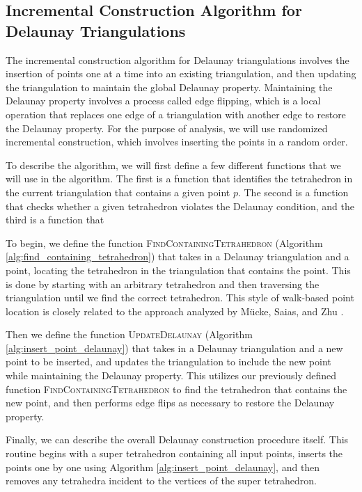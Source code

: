 \documentclass{article}
\begin{document}
\subsection{Incremental Construction Algorithm for Delaunay Triangulations}
The incremental construction algorithm for Delaunay triangulations involves the insertion of points one at a time into an existing triangulation, and then updating the triangulation to maintain the global Delaunay property. Maintaining the Delaunay property involves a process called edge flipping, which is a local operation that replaces one edge of a triangulation with another edge to restore the Delaunay property. For the purpose of analysis, we will use randomized incremental construction, which involves inserting the points in a random order. 

To describe the algorithm, we will first define a few different functions that we will use in the algorithm. The first is a function that identifies the tetrahedron in the current triangulation that contains a given point $p$. The second is a function that checks whether a given tetrahedron violates the Delaunay condition, and the third is a function that 

To begin, we define the function \textsc{FindContainingTetrahedron} (Algorithm \ref{alg:find_containing_tetrahedron}) that takes in a Delaunay triangulation and a point, locating the tetrahedron in the triangulation that contains the point. This is done by starting with an arbitrary tetrahedron and then traversing the triangulation until we find the correct tetrahedron. This style of walk-based point location is closely related to the approach analyzed by M\"ucke, Saias, and Zhu \cite{muckeFastRandomizedPoint}.

Then we define the function \textsc{UpdateDelaunay} (Algorithm \ref{alg:insert_point_delaunay}) that takes in a Delaunay triangulation and a new point to be inserted, and updates the triangulation to include the new point while maintaining the Delaunay property. This utilizes our previously defined function \textsc{FindContainingTetrahedron} to find the tetrahedron that contains the new point, and then performs edge flips as necessary to restore the Delaunay property.

Finally, we can describe the overall Delaunay construction procedure itself. This routine begins with a super tetrahedron containing all input points, inserts the points one by one using Algorithm \ref{alg:insert_point_delaunay}, and then removes any tetrahedra incident to the vertices of the super tetrahedron.
\end{document}
